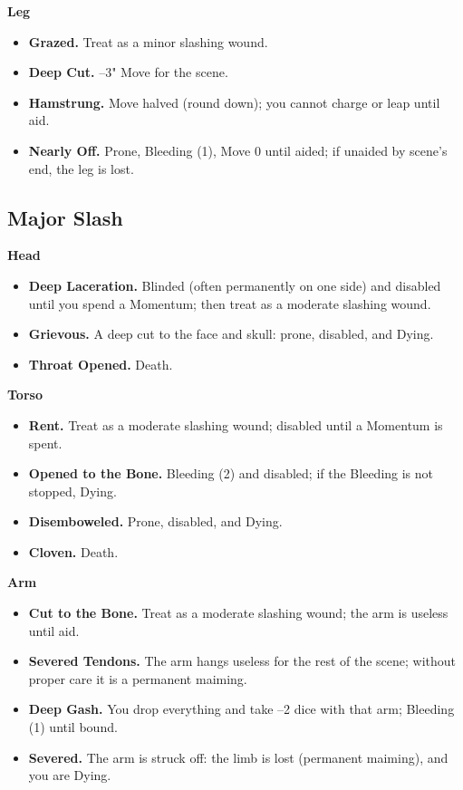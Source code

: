 \textbf{Leg}
\begin{itemize}
    \item[1] \textbf{Grazed.} Treat as a minor slashing wound.
    \item[2] \textbf{Deep Cut.} --3" Move for the scene.
    \item[3] \textbf{Hamstrung.} Move halved (round down); you cannot charge or leap until aid.
    \item[4] \textbf{Nearly Off.} Prone, Bleeding (1), Move 0 until aided; if unaided by scene's end, the leg is lost.
\end{itemize}

\subsection{Major Slash}

\textbf{Head}
\begin{itemize}
    \item[1] \textbf{Deep Laceration.} Blinded (often permanently on one side) and disabled until you spend a Momentum; then treat as a moderate slashing wound.
    \item[2] \textbf{Grievous.} A deep cut to the face and skull: prone, disabled, and Dying.
    \item[3--4] \textbf{Throat Opened.} Death.
\end{itemize}

\textbf{Torso}
\begin{itemize}
    \item[1] \textbf{Rent.} Treat as a moderate slashing wound; disabled until a Momentum is spent.
    \item[2] \textbf{Opened to the Bone.} Bleeding (2) and disabled; if the Bleeding is not stopped, Dying.
    \item[3] \textbf{Disemboweled.} Prone, disabled, and Dying.
    \item[4] \textbf{Cloven.} Death.
\end{itemize}

\textbf{Arm}
\begin{itemize}
    \item[1] \textbf{Cut to the Bone.} Treat as a moderate slashing wound; the arm is useless until aid.
    \item[2] \textbf{Severed Tendons.} The arm hangs useless for the rest of the scene; without proper care it is a permanent maiming.
    \item[3] \textbf{Deep Gash.} You drop everything and take --2 dice with that arm; Bleeding (1) until bound.
    \item[4] \textbf{Severed.} The arm is struck off: the limb is lost (permanent maiming), and you are Dying.
\end{itemize}

